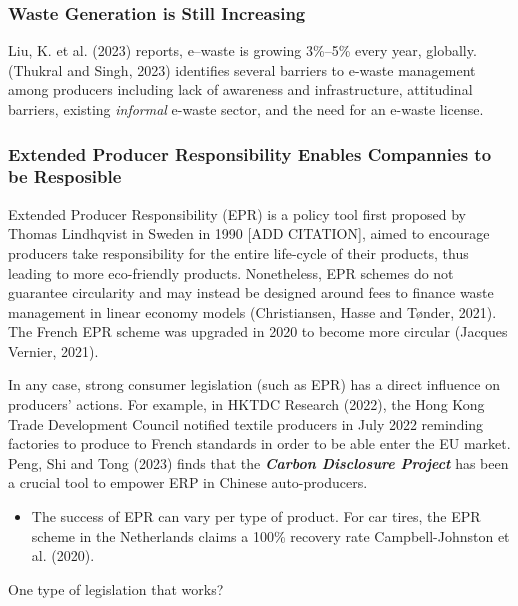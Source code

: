 \documentclass[
  letterpaper,
  DIV=11,
  numbers=noendperiod]{scrartcl}
\providecommand{\tightlist}{%
  \setlength{\itemsep}{0pt}\setlength{\parskip}{0pt}}\usepackage{longtable,booktabs,array}
\begin{document}
\subsubsection{Waste Generation is Still
Increasing}\label{waste-generation-is-still-increasing}

Liu, K. et al. (2023) reports, e--waste is growing 3\%--5\% every year,
globally. (Thukral and Singh, 2023) identifies several barriers to
e-waste management among producers including lack of awareness and
infrastructure, attitudinal barriers, existing \emph{informal} e-waste
sector, and the need for an e-waste license.

\subsubsection{Extended Producer Responsibility Enables Compannies to be
Resposible}\label{extended-producer-responsibility-enables-compannies-to-be-resposible}

Extended Producer Responsibility (EPR) is a policy tool first proposed
by Thomas Lindhqvist in Sweden in 1990 {[}ADD CITATION{]}, aimed to
encourage producers take responsibility for the entire life-cycle of
their products, thus leading to more eco-friendly products. Nonetheless,
EPR schemes do not guarantee circularity and may instead be designed
around fees to finance waste management in linear economy models
(Christiansen, Hasse and Tønder, 2021). The French EPR scheme was
upgraded in 2020 to become more circular (Jacques Vernier, 2021).

In any case, strong consumer legislation (such as EPR) has a direct
influence on producers' actions. For example, in HKTDC Research (2022),
the Hong Kong Trade Development Council notified textile producers in
July 2022 reminding factories to produce to French standards in order to
be able enter the EU market. Peng, Shi and Tong (2023) finds that the
\textbf{\emph{Carbon Disclosure Project}} has been a crucial tool to
empower ERP in Chinese auto-producers.

\begin{itemize}
\tightlist
\item
  The success of EPR can vary per type of product. For car tires, the
  EPR scheme in the Netherlands claims a 100\% recovery rate
  Campbell-Johnston et al. (2020).
\end{itemize}

One type of legislation that works?
\end{document}
